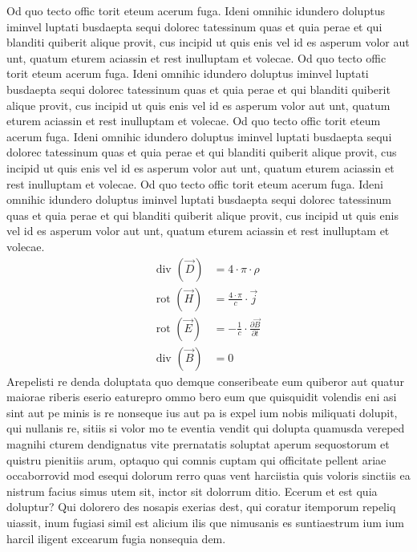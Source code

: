 Od quo tecto offic torit eteum acerum fuga. Ideni omnihic idundero doluptus iminvel luptati busdaepta sequi dolorec tatessinum quas et quia perae et qui blanditi quiberit alique provit, cus incipid ut quis enis vel id es asperum volor aut unt, quatum eturem aciassin et rest inulluptam et volecae. Od quo tecto offic torit eteum acerum fuga. Ideni omnihic idundero doluptus iminvel luptati busdaepta sequi dolorec tatessinum quas et quia perae et qui blanditi quiberit alique provit, cus incipid ut quis enis vel id es asperum volor aut unt, quatum eturem aciassin et rest inulluptam et volecae. Od quo tecto offic torit eteum acerum fuga. Ideni omnihic idundero doluptus iminvel luptati busdaepta sequi dolorec tatessinum quas et quia perae et qui blanditi quiberit alique provit, cus incipid ut quis enis vel id es asperum volor aut unt, quatum eturem aciassin et rest inulluptam et volecae. Od quo tecto offic torit eteum acerum fuga. Ideni omnihic idundero doluptus iminvel luptati busdaepta sequi dolorec tatessinum quas et quia perae et qui blanditi quiberit alique provit, cus incipid ut quis enis vel id es asperum volor aut unt, quatum eturem aciassin et rest inulluptam et volecae.
\begin{subequations}
	\label{maxwell-gleichungen}
	\begin{align}
	\text{div }(\vec{D}) &= 4 \cdot \pi \cdot \rho
	\label{coulomb-gesetz}\\
	\text{rot }(\vec{H}) &= \frac{4 \cdot \pi}{c} \cdot \vec{j}
	\label{ampere-gesetz}\\
	\text{rot }(\vec{E}) &= - \frac{1}{c} \cdot \frac{\partial \vec{B}}{\partial t}
	\label{faraday-gesetz-1} \\
	\text{div }(\vec{B}) &= 0
	\label{faraday-gesetz-2}
	\end{align}
\end{subequations}
Arepelisti re denda doluptata quo demque conseribeate eum quiberor aut quatur maiorae riberis eserio eaturepro ommo bero eum que quisquidit volendis eni asi sint aut pe minis is re nonseque ius aut pa is expel ium nobis miliquati dolupit, qui nullanis re, sitiis si volor mo te eventia vendit qui dolupta quamusda vereped magnihi cturem dendignatus vite prernatatis soluptat aperum sequostorum et quistru pienitiis arum, optaquo qui comnis cuptam qui officitate pellent ariae occaborrovid mod esequi dolorum rerro quas vent harciistia quis voloris sinctiis ea nistrum facius simus utem sit, inctor sit dolorrum ditio. Ecerum et est quia doluptur? Qui dolorero des nosapis exerias dest, qui coratur itemporum repeliq uiassit, inum fugiasi simil est alicium ilis que nimusanis es suntiaestrum ium ium harcil iligent excearum fugia nonsequia dem.
